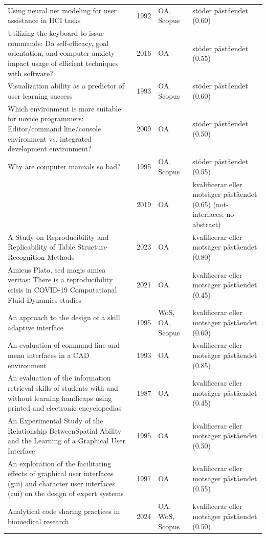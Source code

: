 \begin{longtable}{@{}%
  >{\raggedright\arraybackslash}p{}c%
  >{\raggedright\arraybackslash}p{}%
  >{\raggedright\arraybackslash}p{}@{}}
Using neural net modeling for user assistance in HCI tasks & 1992 & OA, Scopus & stöder påståendet (0.60) \\
Utilizing the keyboard to issue commands: Do self-efficacy, goal orientation, and computer anxiety impact usage of efficient techniques with software? & 2016 & OA & stöder påståendet (0.55) \\
Visualization ability as a predictor of user learning success & 1993 & OA, Scopus & stöder påståendet (0.60) \\
Which environment is more suitable for novice programmers: Editor/command line/console environment vs. integrated development environment? & 2009 & OA & stöder påståendet (0.50) \\
Why are computer manuals so bad? & 1995 & OA, Scopus & stöder påståendet (0.55) \\
 & 2019 & OA & kvalificerar eller motsäger påståendet (0.65) (not-interfaces; no-abstract) \\
A Study on Reproducibility and Replicability of Table Structure Recognition Methods & 2023 & OA & kvalificerar eller motsäger påståendet (0.80) \\
Amicus Plato, sed magis amica veritas: There is a reproducibility crisis in COVID-19 Computational Fluid Dynamics studies & 2021 & OA & kvalificerar eller motsäger påståendet (0.45) \\
An approach to the design of a skill adaptive interface & 1995 & WoS, OA, Scopus & kvalificerar eller motsäger påståendet (0.60) \\
An evaluation of command line and menu interfaces in a CAD environment & 1993 & OA & kvalificerar eller motsäger påståendet (0.85) \\
An evaluation of the information retrieval skills of students with and without learning handicaps using printed and electronic encyclopedias & 1987 & OA & kvalificerar eller motsäger påståendet (0.45) \\
An Experimental Study of the Relationship BetweenSpatial Ability and the Learning of a Graphical User Interface & 1995 & OA & kvalificerar eller motsäger påståendet (0.50) \\
An exploration of the facilitating effects of graphical user interfaces (gui) and character user interfaces (cui) on the design of expert systems & 1997 & OA & kvalificerar eller motsäger påståendet (0.55) \\
Analytical code sharing practices in biomedical research & 2024 & OA, WoS, Scopus & kvalificerar eller motsäger påståendet (0.50) \\

\end{longtable}
